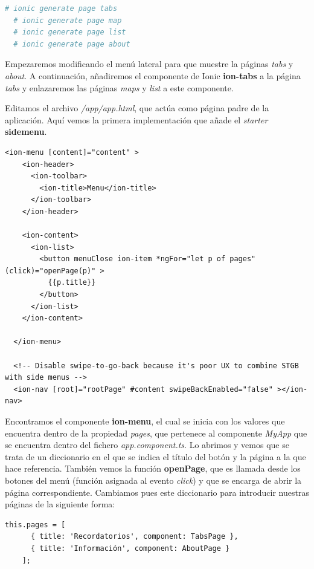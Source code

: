 \begin{lstlisting}[language=bash]
  # ionic generate page tabs
  # ionic generate page map
  # ionic generate page list
  # ionic generate page about
\end{lstlisting}

Empezaremos modificando el menú lateral para que muestre la páginas \emph{tabs} y \emph{about}. A continuación, añadiremos el componente de Ionic \textbf{ion-tabs} a la página \emph{tabs} y enlazaremos las páginas \emph{maps} y \emph{list} a este componente.

Editamos el archivo \emph{/app/app.html}, que actúa como página padre de la aplicación. Aquí vemos la primera implementación que añade el \emph{starter} \textbf{sidemenu}.

\begin{lstlisting}[style=htmlcssjs,frame=tlrb,xleftmargin={0.2cm}]
  <ion-menu [content]="content" >
    <ion-header>
      <ion-toolbar>
        <ion-title>Menu</ion-title>
      </ion-toolbar>
    </ion-header>

    <ion-content>
      <ion-list>
        <button menuClose ion-item *ngFor="let p of pages" (click)="openPage(p)" >
          {{p.title}}
        </button>
      </ion-list>
    </ion-content>

  </ion-menu>

  <!-- Disable swipe-to-go-back because it's poor UX to combine STGB with side menus -->
  <ion-nav [root]="rootPage" #content swipeBackEnabled="false" ></ion-nav>
\end{lstlisting}

Encontramos el componente \textbf{ion-menu}, el cual se inicia con los valores que encuentra dentro de la propiedad \emph{pages}, que pertenece al componente \emph{MyApp} que se encuentra dentro del fichero \emph{app.component.ts}. Lo abrimos y vemos que se trata de un diccionario en el que se indica el título del botón y la página a la que hace referencia. También vemos la función \textbf{openPage}, que es llamada desde los botones del menú (función asignada al evento \emph{click}) y que se encarga de abrir la página correspondiente. Cambiamos pues este diccionario para introducir nuestras páginas de la siguiente forma:

\begin{lstlisting}[style=htmlcssjs,frame=tlrb,xleftmargin={0.2cm}]
    this.pages = [
      { title: 'Recordatorios', component: TabsPage },
      { title: 'Información', component: AboutPage }
    ];
\end{lstlisting}

